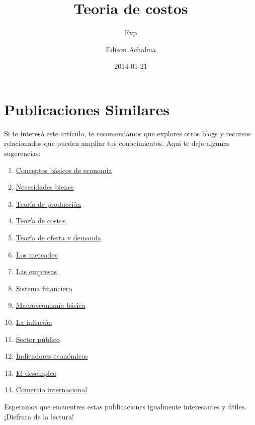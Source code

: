 \documentclass[
  a4paper,
]{article}
\title{Teoria de costos}
\subtitle{Exp}
\author{Edison Achalma}
\date{2014-01-21}
\begin{document}
\maketitle
\ifdefined\Shaded\renewenvironment{Shaded}{\begin{tcolorbox}[sharp corners, frame hidden, boxrule=0pt, enhanced, borderline west={3pt}{0pt}{shadecolor}, breakable, interior hidden]}{\end{tcolorbox}}\fi

\hypertarget{publicaciones-similares}{%
\section{Publicaciones Similares}\label{publicaciones-similares}}

Si te interesó este artículo, te recomendamos que explores otros blogs y
recursos relacionados que pueden ampliar tus conocimientos. Aquí te dejo
algunas sugerencias:

\begin{enumerate}
\def\labelenumi{\arabic{enumi}.}
\item
  \href{../2014-01-01-01-conceptos-basicos-de-economia/index.qmd}{Conceptos
  básicos de economía}
\item
  \href{../2014-01-07-02-necesidades-bienes/index.qmd}{Necesidades
  bienes}
\item
  \href{../2014-01-14-03-teoria-produccion/index.qmd}{Teoría de
  producción}
\item
  \href{../2014-01-21-04-teoria-costos/index.qmd}{Teoría de costos}
\item
  \href{../2014-01-28-05-teoria-oferta-demanda/index.qmd}{Teoría de
  oferta y demanda}
\item
  \href{../2014-02-04-06-mercados/index.qmd}{Los mercados}
\item
  \href{../2014-02-11-07-empresas/index.qmd}{Las empresas}
\item
  \href{../2014-02-18-08-sistema-financiero/index.qmd}{Sistema
  financiero}
\item
  \href{../2014-02-25-09-macroeconomia-basica/index.qmd}{Macroeconomía
  básica}
\item
  \href{../2014-03-01-10-inflacion/index.qmd}{La inflación}
\item
  \href{../2014-03-08-11-sector-publico/index.qmd}{Sector público}
\item
  \href{../2014-03-15-12-indicadores-economicos/index.qmd}{Indicadores
  económicos}
\item
  \href{../2014-03-22-13-desempleo/index.qmd}{El desempleo}
\item
  \href{../2014-03-29-14-comercio-internacional/index.qmd}{Comercio
  internacional}
\end{enumerate}

Esperamos que encuentres estas publicaciones igualmente interesantes y
útiles. ¡Disfruta de la lectura!


\printbibliography
\end{document}
